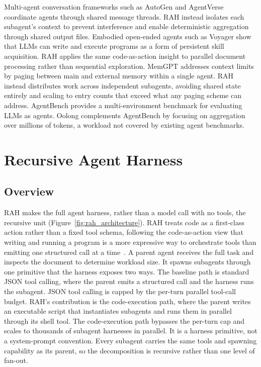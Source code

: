 \documentclass[sigconf,nonacm]{acmart}
\begin{document}
Multi-agent conversation frameworks such as AutoGen \cite{wu2023autogen} and AgentVerse \cite{chen2023agentverse} coordinate agents through shared message threads. RAH instead isolates each subagent's context to prevent interference and enable deterministic aggregation through shared output files.
Embodied open-ended agents such as Voyager \cite{wang2023voyager} show that LLMs can write and execute programs as a form of persistent skill acquisition. RAH applies the same code-as-action insight to parallel document processing rather than sequential exploration.
MemGPT \cite{packer2023memgpt} addresses context limits by paging between main and external memory within a single agent. RAH instead distributes work across independent subagents, avoiding shared state entirely and scaling to entry counts that exceed what any paging scheme can address.
AgentBench \cite{liu2024agentbench} provides a multi-environment benchmark for evaluating LLMs as agents. Oolong complements AgentBench by focusing on aggregation over millions of tokens, a workload not covered by existing agent benchmarks.


\section{Recursive Agent Harness}
\label{sec:rah}

\subsection{Overview}
RAH makes the full agent harness, rather than a model call with no tools, the recursive unit (Figure~\ref{fig:rah_architecture}).
RAH treats code as a first-class action rather than a fixed tool schema, following the code-as-action view that writing and running a program is a more expressive way to orchestrate tools than emitting one structured call at a time~\cite{wang2024codeact}.
A parent agent receives the full task and inspects the document to determine workload size.
It spawns subagents through one primitive that the harness exposes two ways.
The baseline path is standard JSON tool calling, where the parent emits a structured call and the harness runs the subagent.
JSON tool calling is capped by the per-turn parallel tool-call budget.
RAH's contribution is the code-execution path, where the parent writes an executable script that instantiates subagents and runs them in parallel through its shell tool.
The code-execution path bypasses the per-turn cap and scales to thousands of subagent harnesses in parallel.
It is a harness primitive, not a system-prompt convention.
Every subagent carries the same tools and spawning capability as its parent, so the decomposition is recursive rather than one level of fan-out.
\end{document}
